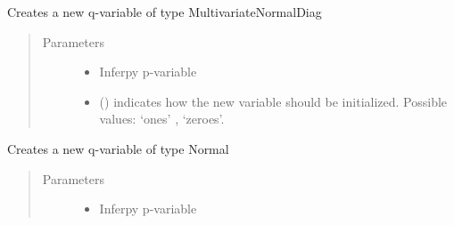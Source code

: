 \documentclass[letterpaper,10pt,english]{sphinxmanual}
\begin{document}
\begin{fulllineitems}
\begin{fulllineitems}
\begin{quote}
\begin{description}
\begin{itemize}
\end{itemize}

\end{description}\end{quote}

\end{fulllineitems}


\begin{fulllineitems}
\label{\detokenize{modules/inferpy.inferences:inferpy.inferences.qmodel.Qmodel.MultivariateNormalDiag}}
Creates a new q-variable of type MultivariateNormalDiag
\begin{quote}\begin{description}
\item[{Parameters}] \leavevmode\begin{itemize}
\item {} 
 \textendash{} Inferpy p-variable

\item {} 
 () \textendash{} indicates how the new variable should be initialized. Possible values: ‘ones’ , ‘zeroes’.

\end{itemize}

\end{description}\end{quote}

\end{fulllineitems}


\begin{fulllineitems}
\label{\detokenize{modules/inferpy.inferences:inferpy.inferences.qmodel.Qmodel.Normal}}
Creates a new q-variable of type Normal
\begin{quote}\begin{description}
\item[{Parameters}] \leavevmode\begin{itemize}
\item {} 
 \textendash{} Inferpy p-variable


\end{itemize}
\end{description}
\end{quote}
\end{fulllineitems}
\end{fulllineitems}
\end{document}
